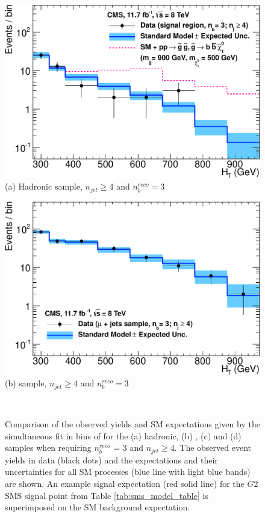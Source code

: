 \begin{figure}[ht]
\footnotesize
\centering
\begin{minipage}[b]{0.48 \linewidth}
\includegraphics[width = 1.0\linewidth]{plots/hadronic_3b_ge4j_logy.pdf}
\centering (a)  Hadronic sample, $n_{jet} \geq 4$ and $n_{b}^{reco} = 3$ 
\end{minipage}
\quad
\begin{minipage}[b]{0.48\linewidth}
\includegraphics[width = 1.0\linewidth]{plots/muon_3b_ge4j_logy.pdf}
\centering (b)  \mupjets sample, $n_{jet} \geq 4$ and $n_{b}^{reco} = 3$  
\end{minipage} \\
\caption[Comparison of the observed yields and \ac{SM} expectations given by the simultaneous fit in bins of \theht for the (a) hadronic, (b) \mupjets, (c$)$ \dimupjets and (d) \gpjets samples when requiring $n_{b}^{reco}$ = 3 and $n_{jet} \geq 4$.]{Comparison of the observed yields and \ac{SM} expectations given by the simultaneous fit in bins of \theht for the (a) hadronic, (b) \mupjets, (c$)$ \dimupjets and (d) \gpjets samples when requiring $n_{b}^{reco}$ = 3 and $n_{jet} \geq 4$. The observed event yields in data (black dots) and the expectations and their uncertainties for all SM processes (blue line with light blue bands) are shown. An example signal expectation (red solid line) for the $G2$ \ac{SMS} signal point from Table \ref{tab:sms_model_table} is superimposed on the \ac{SM} background expectation.}
\label{fig:result3bhigh}
\end{figure}

